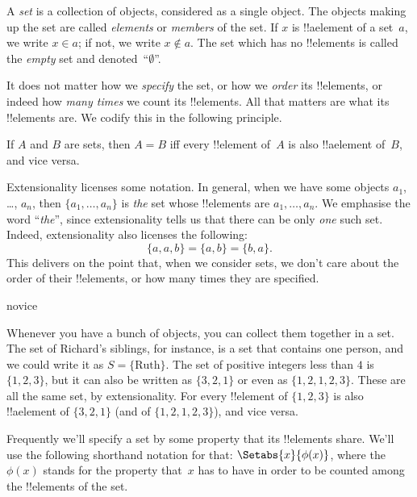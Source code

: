 \documentclass[../../../include/open-logic-section]{subfiles}
\begin{document}

A \emph{set} is a collection of objects, considered {as} a single
object. The objects making up the set are called \emph{elements} or
\emph{members} of the set. If $x$ is !!a{element} of a set~$a$, we
write $x \in a$; if not, we write $x \notin a$. The set which has no
!!{element}s is called the \emph{empty} set and
denoted~``$\emptyset$''.

\begin{explain}
It does not matter how we \emph{specify} the set, or how we
\emph{order} its !!{element}s, or indeed how \emph{many times} we
count its !!{element}s. All that matters are what its !!{element}s
are. We codify this in the following principle.
\end{explain}

\begin{defn}[Extensionality] If $A$ and $B$ are sets, then $A = B$ iff
  every !!{element} of~$A$ is also !!a{element} of~$B$, and vice
  versa.
\end{defn}

Extensionality licenses some notation. In general, when we have some
objects $a_{1}$, \dots, $a_{n}$, then $\{a_{1}, \dots, a_{n}\}$ is
\emph{the} set whose !!{element}s are $a_1, \ldots, a_n$. We emphasise
the word ``\emph{the}'', since extensionality tells us that there can
be only \emph{one} such set. Indeed, extensionality also licenses the
following:
	\[
    \{a, a, b\} = \{a, b\} = \{b,a\}.
  \] 
This delivers on the point that, when we consider sets, we don't care
about the order of their !!{element}s, or how many times they are
specified.  

\begin{tagblock}{novice}
\begin{ex}
Whenever you have a bunch of objects, you can collect them together in
a set. The set of Richard's siblings, for instance, is a set that
contains one person, and we could write it as $S=\{\textrm{Ruth}\}$.
The set of positive integers less than $4$ is $\{1, 2, 3\}$, but it
can also be written as $\{3, 2, 1\}$ or even as $\{1, 2, 1, 2, 3\}$.
These are all the same set, by extensionality. For every !!{element}
of $\{1, 2, 3\}$ is also !!a{element} of $\{3, 2, 1\}$ (and of $\{1,
2, 1, 2, 3\}$), and vice versa.
\end{ex} 
\end{tagblock}

Frequently we'll specify a set by some property that its !!{element}s
share. We'll use the following shorthand notation for that:
$\Setabs{x}{\phi(x)}$, where the $\phi(x)$ stands for the property
that~$x$ has to have in order to be counted among the !!{element}s of
the set. 
\end{document}
